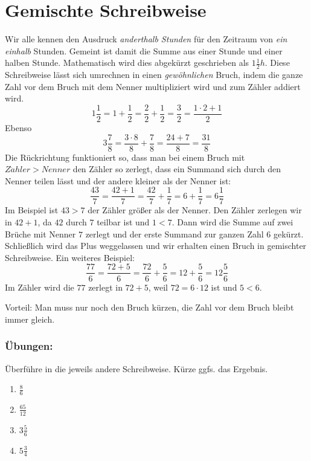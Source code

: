 \section{Gemischte Schreibweise}\vspace{-1em}
Wir alle kennen den Ausdruck \emph{anderthalb Stunden} für den Zeitraum von \emph{ein einhalb} Stunden. Gemeint ist damit die Summe aus einer Stunde und einer halben Stunde. Mathematisch wird dies abgekürzt geschrieben als $1\frac{1}{2}h$. Diese Schreibweise lässt sich umrechnen in einen \emph{gewöhnlichen} Bruch, indem die ganze Zahl vor dem Bruch mit dem Nenner multipliziert wird und zum Zähler addiert wird.
\begin{equation*}
	1\frac{1}{2}= 1+\frac{1}{2} = \frac{2}{2}+\frac{1}{2}=\frac{3}{2}=\frac{1\cdot 2+1}{2}
\end{equation*}
Ebenso
\begin{equation*}
	3\frac{7}{8}= \frac{3\cdot 8}{8}+\frac{7}{8}=\frac{24+7}{8}= \frac{31}{8}
\end{equation*}
Die Rückrichtung funktioniert so, dass man bei einem Bruch mit $Z\ddot{a}hler>Nenner$ den Zähler so zerlegt, dass ein Summand sich durch den Nenner teilen lässt und der andere kleiner als der Nenner ist:
\begin{equation*}
	\frac{43}{7}=\frac{42+1}{7}=\frac{42}{7}+\frac{1}{7}=6+\frac{1}{7}=6\frac{1}{7}
\end{equation*}
Im Beispiel ist $43>7$ der Zähler größer als der Nenner. Den Zähler zerlegen wir in $42+1$, da $42$ durch $7$ teilbar ist und $1<7$. Dann wird die Summe auf zwei Brüche mit Nenner $7$ zerlegt und der erste Summand zur ganzen Zahl $6$ gekürzt. Schließlich wird das Plus weggelassen und wir erhalten einen Bruch in gemischter Schreibweise.
Ein weiteres Beispiel:
\begin{equation*}
	\frac{77}{6}=\frac{72+5}{6}=\frac{72}{6}+\frac{5}{6}=12+\frac{5}{6}=12\frac{5}{6}
\end{equation*}
Im Zähler wird die $77$ zerlegt in $72+5$, weil $72=6\cdot12$ ist und $5<6$.

Vorteil: Man muss nur noch den Bruch kürzen, die Zahl vor dem Bruch bleibt immer gleich.

\subsubsection*{Übungen:}\vspace{-1em}
Überführe in die jeweils andere Schreibweise. Kürze ggfs. das Ergebnis.
\begin{multicols}{2}
	\begin{enumerate}[label=\alph*)]
		\item $\frac{8}{6}$
		\item $\frac{65}{12}$
		\item $3\frac{5}{6}$
		\item $5\frac{3}{4}$
	\end{enumerate}
\end{multicols}